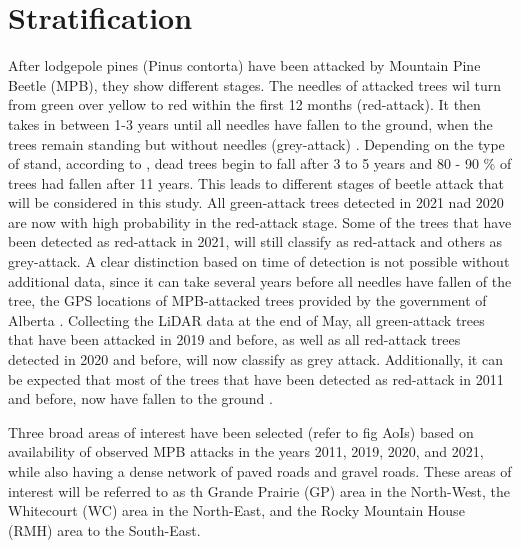 \documentclass[
]{article}
\author{}
\date{\vspace{-2.5em}}
\begin{document}
{
\setcounter{tocdepth}{2}
\tableofcontents
}
\hypertarget{stratification}{%
\section{Stratification}\label{stratification}}

After lodgepole pines (Pinus contorta) have been attacked by Mountain Pine Beetle (MPB), they show different stages. The needles of attacked trees wil turn from green over yellow to red within the first 12 months (red-attack). It then takes in between 1-3 years until all needles have fallen to the ground, when the trees remain standing but without needles (grey-attack) \autocite{wulderRemoteSensingSurvey2005}. Depending on the type of stand, according to \textcite{mitchellFallRateLodgepole1998}, dead trees begin to fall after 3 to 5 years and 80 - 90 \% of trees had fallen after 11 years.
This leads to different stages of beetle attack that will be considered in this study. All green-attack trees detected in 2021 nad 2020 are now with high probability in the red-attack stage. Some of the trees that have been detected as red-attack in 2021, will still classify as red-attack and others as grey-attack. A clear distinction based on time of detection is not possible without additional data, since it can take several years before all needles have fallen of the tree, the GPS locations of MPB-attacked trees provided by the government of Alberta \autocite{wulderRemoteSensingSurvey2005}. Collecting the LiDAR data at the end of May, all green-attack trees that have been attacked in 2019 and before, as well as all red-attack trees detected in 2020 and before, will now classify as grey attack. Additionally, it can be expected that most of the trees that have been detected as red-attack in 2011 and before, now have fallen to the ground \autocite{schoennagelEffectsMountainPine2012}.

Three broad areas of interest have been selected (refer to fig AoIs) based on availability of observed MPB attacks in the years 2011, 2019, 2020, and 2021, while also having a dense network of paved roads and gravel roads. These areas of interest will be referred to as th Grande Prairie (GP) area in the North-West, the Whitecourt (WC) area in the North-East, and the Rocky Mountain House (RMH) area to the South-East.
\end{document}
